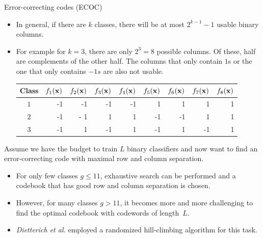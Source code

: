 \documentclass[11pt,compress,t,notes=noshow, xcolor=table]{beamer}
\begin{document}
\begin{vbframe}{Error-correcting codes (ECOC)}
\begin{itemize}
  \item In general, if there are $k$ classes, there will be at most $2^{k -1}- 1$ usable binary columns.  
  \item For example for $k = 3$, there are only $2^3 = 8$ possible columns. Of these, half are complements of the other half. The columns that only contain $1$s or the one that only contains $-1s$ are also not usable.
\begin{footnotesize}
  \begin{table}[]
  \begin{tabular}{|c|r|r|r|r|r|r|r|r|} \hline
  \textbf{Class}  & \textbf{$f_1{(\mathbf{x})}$} & \textbf{$f_2{(\mathbf{x})}$}  & \textbf{$f_3{(\mathbf{x})}$} & \textbf{$f_4{(\mathbf{x})}$} & \textbf{$f_5{(\mathbf{x})}$} & \textbf{$f_6{(\mathbf{x})}$} & \textbf{$f_7{(\mathbf{x})}$} & \textbf{$f_8{(\mathbf{x})}$}\\ \hline
  \textbf{$1$} & -1 & -1 & -1 & -1 & 1 & 1 & 1 & 1 \\ \hline
  \textbf{$2$} & -1 & - 1 & 1 & 1 & -1 & -1 & 1 & 1 \\ \hline
  \textbf{$3$} & -1 & 1 & -1 & 1 & -1 & 1 & -1 & 1\\ \hline
  \end{tabular}
  \end{table}
\end{footnotesize}

\end{itemize}

\framebreak 

Assume we have the budget to train $L$
 binary classifiers and now want to find an error-correcting code with maximal row and column separation. 

\begin{itemize}
  \item For only few classes $g \le 11$, exhaustive search can be performed and a codebook that has good row and column separation is chosen. 
  \item However, for many classes $g > 11$, it becomes more and more challenging to find the optimal codebook with codewords of length~$L$.
  \item \emph{Dietterich et al.} employed a randomized hill-climbing algorithm for this task. 

\end{itemize}

\end{vbframe}
\end{document}
